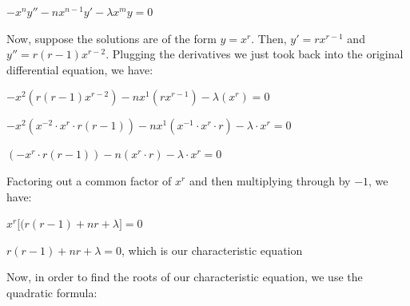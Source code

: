 \documentclass[executivepaper]{article}
\begin{document}
\begin{center}

$-x^ny''-nx^{n-1}y'-\lambda x^my=0$

\end{center}

\vspace{3mm}

Now, suppose the solutions are of the form $y=x^r$. Then, $y'=rx^{r-1}$ and $y''=r(r-1)x^{r-2}$. Plugging the derivatives we just took back into the original differential equation, we have:

\begin{center}

$-x^2(r(r-1)x^{r-2})-nx^1(rx^{r-1})-\lambda(x^r)=0$

\hspace{1mm}

$-x^2(x^{-2} \cdot x^r \cdot r(r-1))-nx^1(x^{-1} \cdot x^r \cdot r)-\lambda \cdot x^r=0$

\hspace{1mm}

$(-x^r \cdot r(r-1))-n(x^r \cdot r)-\lambda \cdot x^r=0$

\vspace{3mm}

Factoring out a common factor of $x^r$ and then multiplying through by $-1$, we have:

\vspace{3mm}

$x^r \bigg[(r(r-1)+nr+\lambda \bigg]=0$

\hspace{1mm}

$r(r-1)+nr+\lambda=0$, which is our characteristic equation

\end{center}

Now, in order to find the roots of our characteristic equation, we use the quadratic formula:

\pagebreak

\vspace*{-40mm}
\end{document}
